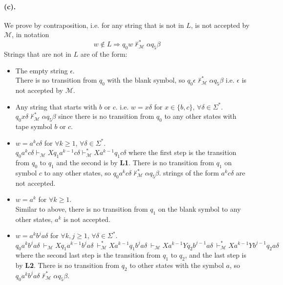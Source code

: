 \documentclass[12pt]{article}
\begin{document}
\paragraph*{(c).} We prove by contraposition, i.e. for any string that is not in \(L\), is not accepted by \(\mathcal{M}\), in notation
  \begin{equation*}
    w \notin L \Rightarrow q_0w \nvdash^*_\mathcal{M} \alpha q_5 \beta
  \end{equation*}
Strings that are not in \(L\) are of the form:
\begin{itemize}
  \item The empty string \(\epsilon\).\\ There is no transition from \(q_0\) with the blank symbol, so \(q_0\epsilon \nvdash^*_\mathcal{M} \alpha q_5 \beta\) i.e. \(\epsilon\) is not accepted by \(\mathcal{M}\).
  \item Any string that starts with \(b\) or \(c\). i.e. \(w = x\delta\) for \(x \in \{b, c\}\), \(\forall \delta \in \Sigma^*\).\\ \(q_0x\delta \nvdash^*_\mathcal{M} \alpha q_5 \beta\) since there is no transition from \(q_0\) to any other states with tape symbol \(b\) or \(c\).
  \item \(w = a^kc\delta\) for \(\forall k \geq 1\), \(\forall \delta \in \Sigma^*\).\\
  \(q_0a^kc\delta \vdash_\mathcal{M} Xq_1a^{k-1}c\delta \vdash^*_\mathcal{M} Xa^{k-1}q_1c\delta\) where the first step is the transition from \(q_0\) to \(q_1\) and the second is by \textbf{L1}. There is no transition from \(q_1\) on symbol \(c\) to any other states, so \(q_0a^kc\delta \nvdash^*_\mathcal{M} \alpha q_5 \beta\). strings of the form \(a^kc\delta\) are not accepted.
  \item \(w = a^k\) for \(\forall k \geq 1\).\\
  Similar to above, there is no transition from \(q_1\) on the blank symbol to any other states, \(a^k\) is not accepted.
  \item \(w = a^kb^ja\delta\) for \(\forall k, j \geq 1\), \(\forall \delta \in \Sigma^*\).\\
  \(q_0a^kb^ja\delta\ \vdash_\mathcal{M} Xq_1a^{k-1}b^ja\delta\ \vdash^*_\mathcal{M} Xa^{k-1}q_1b^ja\delta\ \vdash_\mathcal{M} Xa^{k-1}Yq_2b^{j-1}a\delta\ \vdash^*_\mathcal{M} Xa^{k-1}Yb^{j-1}q_2a\delta \) where the second last step is the transition from \(q_1\) to \(q_2\), and the last step is by \textbf{L2}. There is no transition from \(q_2\) to other states with the symbol \(a\), so \(q_0a^kb^ja\delta \nvdash^*_\mathcal{M} \alpha q_5 \beta\).

\end{itemize}
\end{document}
